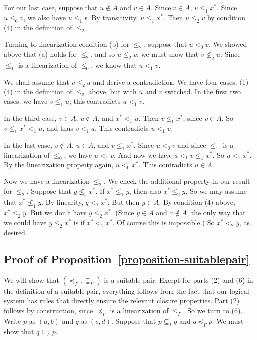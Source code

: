 \documentclass[letterpaper]{article} %
\theoremstyle{definition}
\newcommand{\Aunion}{\mathscr{A}^{\cup}}
\newcommand{\card}{\mathrm{card}}
\newcommand{\suitable}{suitable}%
\newcommand{\provsub}{\subseteq_{\Gamma}}
\newcommand{\provle}{\le_{\Gamma}}
\newcommand{\provextended}{\preceq_{\Gamma}}
\begin{document}
For our last case, suppose that $u\notin A$ and $v\in A$.
Since $v\in A$, $v\leq_1 x^*$.  Since $u\leq_0 v$, we also have 
$u\leq_1 v$.  By transitivity, $u\leq_1 x^*$.
Then $u \leq_2 v$ by condition (4) in the  definition of 
$\leq_2$.
 
 \medskip
 

Turning to linearization condition (b) for $\leq_2$, suppose that $u <_0 v$.
We showed above that (a) holds for $\leq_2$, and so $u \leq_2 v$; we must show that $v \nleq_2 u$.
Since $\leq_1$ is a linearization of $\leq_0$, we know that $u <_1 v$.

We shall assume that $v \leq_2 u$ and derive a contradiction.
We have four cases, (1)--(4) in the definition of $\leq_2$ above, but with $u$ and $v$ switched.  
In the first two cases, we have $v \leq_1 u$; this contradicts  $u <_1 v$.
 
In the third case, $v\in A$, $u\notin A$, and $x^* <_1 u$.
Then $v\leq_1 x^*$, since $v\in A$.
So $v\leq_1 x^* <_1 u$, and thus $v <_1 u$.  
This contradicts  $u <_1 v$.

In the last case, $v\notin A$, $u\in A$,  and $v \leq_1 x^*$.
Since   $u <_0 v$ and since $\leq_1$ is a linearization of $\leq_0$, we have $u <_1 v$.
And now we have $u <_1 v \leq_1 x^*$.  So $u <_1 x^*$.  
By the linearization property again, $u <_0 x^*$.  This contradicts $u\in A$.

\medskip

Now we have a linearization $\leq_2$.
We check the additional property in our result
for  $\leq_2$.  Suppose that $y\nleq_0 x^*$.
If $x^*\leq_1 y$, then also $x^*\leq_2 y$.   So we may assume that  $x^*\nleq_1 y$.  By linearity,
$y <_1 x^*$.
But then $y\in A$.  By condition (4) above, $x^* \leq_2 y$.
But we don't have $y \leq_2 x^*$.
(Since $y\in A$ and $x\notin A$, the only way that we could have  $y \leq_2 x^*$ is if $x^* <_1 x^*$.
Of course this is impossible.)
So $x^* <_2 y$, as desired.

\subsection*{Proof of Proposition~\ref{proposition-suitablepair}}

We will show that $(\provextended, \provsub)$ is a suitable pair.  Except for parts (2) and (6) in the definition of a \suitable{} pair, everything follows from the fact that our logical system has rules that directly ensure the relevant closure properties.  Part (2) follows by construction, since $\provextended$ is a linearization of $\provle$.  So we turn to (6).  Write $p$ as $(a,b)$ and $q$ as $(c,d)$.
Suppose that $p \provsub q$ and $q \provextended p$.    We must show that $q \provsub p$.
    
\end{document}
